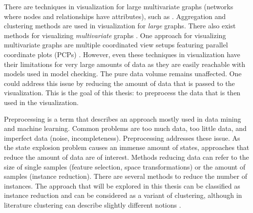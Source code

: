\documentclass[preview]{standalone}
\begin{document}
There are techniques in visualization for large multivariate graphs (networks where nodes and relationships have attributes), such as \mdpsN. Aggregation and clustering methods are used in visualization for \emph{large} graphs\cite{Goerke2009}. There also exist methods for visualizing \emph{multivariate} graphs \cite{Kerren2014,Nobre2019}. One approach for visualizing multivariate graphs are multiple coordinated view setups featuring parallel coordinate plots (PCPs) \cite{Johansson2016}. However, even these techniques in visualization have their limitations for very large amounts of data as they are easily reachable with models used in model checking. The pure data volume remains unaffected. One could address this issue by reducing the amount of data that is passed to the visualization. This is the goal of this thesis: to preprocess the data that is then used in the visualization.

Preprocessing is a term that describes an approach mostly used in data mining and machine learning. Common problems are too much data, too little data, and imperfect data (noise, incompleteness)\cite{Garcia2016}. Preprocessing addresses these issue. As the state explosion problem causes an immense amount of states, approaches that reduce the amount of data are of interest. Methods reducing data can refer to the size of single samples (feature selection, space transformations) or the amount of samples (instance reduction). There are several methods to reduce the number of instances. The approach that will be explored in this thesis can be classified as instance reduction and can be considered as a variant of clustering, although in literature clustering can describe slightly different notions \cite{Alasadi2017,Baskar2013}.
\end{document}
